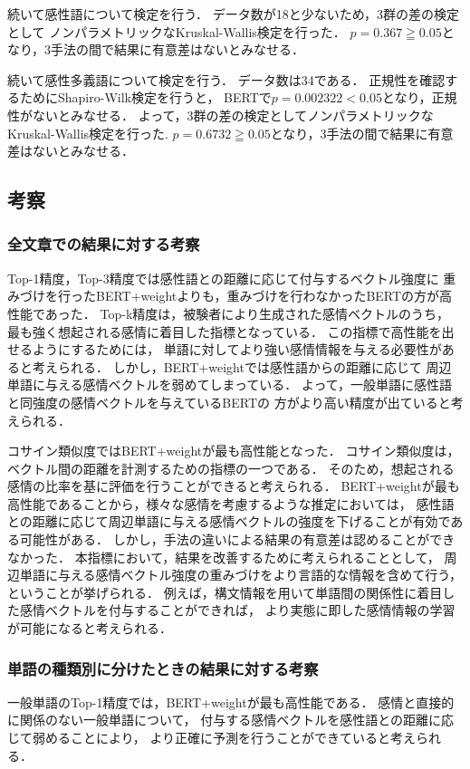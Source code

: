 			続いて感性語について検定を行う．
			データ数が18と少ないため，3群の差の検定として
			ノンパラメトリックなKruskal-Wallis検定を行った．
			$p=0.367\geqq0.05$となり，3手法の間で結果に有意差はないとみなせる．

			続いて感性多義語について検定を行う．
			データ数は34である．
			正規性を確認するためにShapiro-Wilk検定を行うと，
			BERTで$p=0.002322<0.05$となり，正規性がないとみなせる．
			よって，3群の差の検定としてノンパラメトリックなKruskal-Wallis検定を行った.
			$p=0.6732\geqq0.05$となり，3手法の間で結果に有意差はないとみなせる．

	\subsection{考察}
		\subsubsection{全文章での結果に対する考察}
			Top-1精度，Top-3精度では感性語との距離に応じて付与するベクトル強度に
			重みづけを行ったBERT+weightよりも，重みづけを行わなかったBERTの方が高性能であった．
			Top-k精度は，被験者により生成された感情ベクトルのうち，
			最も強く想起される感情に着目した指標となっている．
			この指標で高性能を出せるようにするためには，
			単語に対してより強い感情情報を与える必要性があると考えられる．
			しかし，BERT+weightでは感性語からの距離に応じて
			周辺単語に与える感情ベクトルを弱めてしまっている．
			よって，一般単語に感性語と同強度の感情ベクトルを与えているBERTの
			方がより高い精度が出ていると考えられる．

			コサイン類似度ではBERT+weightが最も高性能となった．
			コサイン類似度は，ベクトル間の距離を計測するための指標の一つである．
			そのため，想起される感情の比率を基に評価を行うことができると考えられる．
			BERT+weightが最も高性能であることから，様々な感情を考慮するような推定においては，
			感性語との距離に応じて周辺単語に与える感情ベクトルの強度を下げることが有効である可能性がある．
			しかし，手法の違いによる結果の有意差は認めることができなかった．
			本指標において，結果を改善するために考えられることとして，
			周辺単語に与える感情ベクトル強度の重みづけをより言語的な情報を含めて行う，
			ということが挙げられる．
			例えば，構文情報を用いて単語間の関係性に着目した感情ベクトルを付与することができれば，
			より実態に即した感情情報の学習が可能になると考えられる．			
			
		\subsubsection{単語の種類別に分けたときの結果に対する考察}
			一般単語のTop-1精度では，BERT+weightが最も高性能である．
			感情と直接的に関係のない一般単語について，
			付与する感情ベクトルを感性語との距離に応じて弱めることにより，
			より正確に予測を行うことができていると考えられる．

